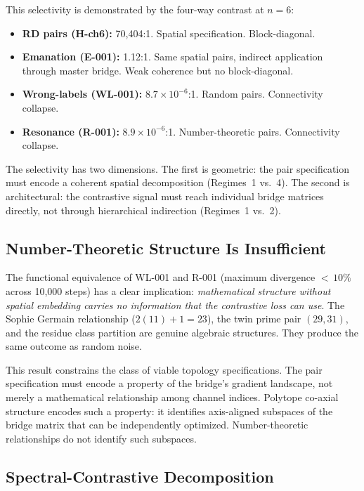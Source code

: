 This selectivity is demonstrated by the four-way contrast at $n = 6$:

\begin{itemize}
  \item \textbf{RD pairs (H-ch6):} 70{,}404:1. Spatial
    specification. Block-diagonal.
  \item \textbf{Emanation (E-001):} 1.12:1. Same spatial pairs,
    indirect application through master bridge. Weak coherence but
    no block-diagonal.
  \item \textbf{Wrong-labels (WL-001):} $8.7 \times 10^{-6}$:1.
    Random pairs. Connectivity collapse.
  \item \textbf{Resonance (R-001):} $8.9 \times 10^{-6}$:1.
    Number-theoretic pairs. Connectivity collapse.
\end{itemize}

The selectivity has two dimensions. The first is geometric: the pair
specification must encode a coherent spatial decomposition (Regimes~1
vs.~4). The second is architectural: the contrastive signal must reach
individual bridge matrices directly, not through hierarchical
indirection (Regimes~1 vs.~2).

\subsection{Number-Theoretic Structure Is Insufficient}

The functional equivalence of WL-001 and R-001 (maximum divergence
${<}\,10\%$ across 10{,}000 steps) has a clear implication:
\emph{mathematical structure without spatial embedding carries no
information that the contrastive loss can use}. The Sophie Germain
relationship ($2(11) + 1 = 23$), the twin prime pair $(29, 31)$, and
the residue class partition are genuine algebraic structures. They
produce the same outcome as random noise.

This result constrains the class of viable topology specifications.
The pair specification must encode a property of the bridge's
gradient landscape, not merely a mathematical relationship among
channel indices. Polytope co-axial structure encodes such a
property: it identifies axis-aligned subspaces of the bridge matrix
that can be independently optimized. Number-theoretic relationships
do not identify such subspaces.

\subsection{Spectral-Contrastive Decomposition}

